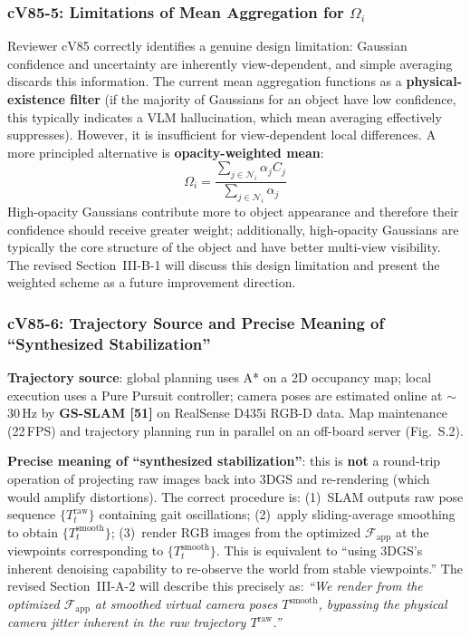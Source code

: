\documentclass[10pt,a4paper]{article}
\begin{document}
\subsubsection*{cV85-5: Limitations of Mean Aggregation for $\Omega_i$}

Reviewer cV85 correctly identifies a genuine design limitation: Gaussian confidence and uncertainty are inherently view-dependent, and simple averaging discards this information. The current mean aggregation functions as a \textbf{physical-existence filter} (if the majority of Gaussians for an object have low confidence, this typically indicates a VLM hallucination, which mean averaging effectively suppresses). However, it is insufficient for view-dependent local differences. A more principled alternative is \textbf{opacity-weighted mean}:
\begin{equation}
  \Omega_i = \frac{\sum_{j\in\mathcal{N}_i}\alpha_j C_j}{\sum_{j\in\mathcal{N}_i}\alpha_j}
\end{equation}
High-opacity Gaussians contribute more to object appearance and therefore their confidence should receive greater weight; additionally, high-opacity Gaussians are typically the core structure of the object and have better multi-view visibility. The revised Section~III-B-1 will discuss this design limitation and present the weighted scheme as a future improvement direction.

\subsubsection*{cV85-6: Trajectory Source and Precise Meaning of ``Synthesized Stabilization''}

\textbf{Trajectory source}: global planning uses A* on a 2D occupancy map; local execution uses a Pure Pursuit controller; camera poses are estimated online at ${\sim}$30\,Hz by \textbf{GS-SLAM [51]} on RealSense D435i RGB-D data. Map maintenance (22\,FPS) and trajectory planning run in parallel on an off-board server (Fig.~S.2).

\textbf{Precise meaning of ``synthesized stabilization''}: this is \textbf{not} a round-trip operation of projecting raw images back into 3DGS and re-rendering (which would amplify distortions). The correct procedure is: (1)~SLAM outputs raw pose sequence $\{T_t^{\text{raw}}\}$ containing gait oscillations; (2)~apply sliding-average smoothing to obtain $\{T_t^{\text{smooth}}\}$; (3)~render RGB images from the optimized $\mathcal{F}_{\text{app}}$ at the viewpoints corresponding to $\{T_t^{\text{smooth}}\}$. This is equivalent to ``using 3DGS's inherent denoising capability to re-observe the world from stable viewpoints.'' The revised Section~III-A-2 will describe this precisely as: \textit{``We render from the optimized $\mathcal{F}_{\text{app}}$ at smoothed virtual camera poses $T^{\text{smooth}}$, bypassing the physical camera jitter inherent in the raw trajectory $T^{\text{raw}}$.''}
\end{document}
